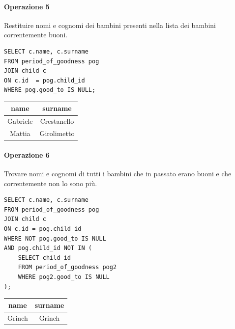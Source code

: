 \documentclass[12pt]{report}
\begin{document}
\paragraph{Operazione 5}Restituire nomi e cognomi dei bambini presenti nella lista dei bambini correntemente buoni.
\begin{lstlisting}
SELECT c.name, c.surname
FROM period_of_goodness pog 
JOIN child c
ON c.id  = pog.child_id 
WHERE pog.good_to IS NULL;
\end{lstlisting}
\begin{center}
    \begin{tabular}{|c|c|}
  \hline
  name & surname \\ \hline
  Gabriele & Crestanello \\ \hline
  Mattia & Girolimetto \\ \hline
\end{tabular}

\end{center}

\paragraph{Operazione 6} Trovare nomi e cognomi di tutti i bambini che in passato erano buoni e che correntemente non
    lo sono più.
\begin{lstlisting}
SELECT c.name, c.surname
FROM period_of_goodness pog
JOIN child c
ON c.id = pog.child_id
WHERE NOT pog.good_to IS NULL 
AND pog.child_id NOT IN (
	SELECT child_id
	FROM period_of_goodness pog2 
	WHERE pog2.good_to IS NULL 
);
\end{lstlisting}
\begin{center}
    \begin{tabular}{|c|c|}
  \hline
  name & surname \\ \hline
  Grinch & Grinch \\ \hline
\end{tabular}

\end{center}
\end{document}
